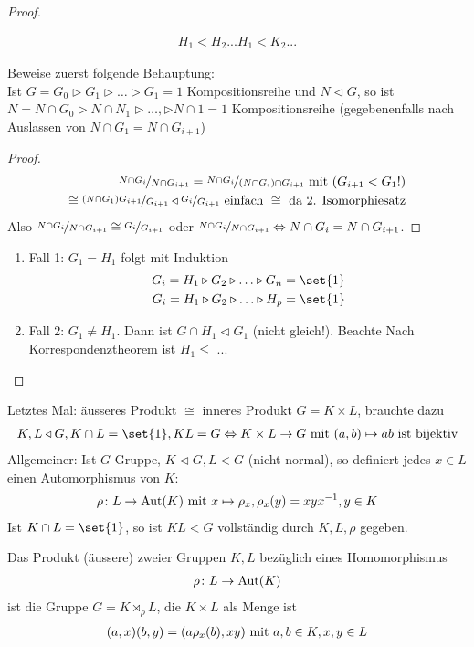\begin{proof}
\begin{itemize}
\begin{align*}
			H_1 < H_2 ...
			H_1 < K_2 ...
		\end{align*}
	\end{itemize}
	Beweise zuerst folgende Behauptung:\\
		Ist $G = G_0 \rhd G_1 \rhd \dots \rhd G_1 = 1$ Kompositionsreihe und $N \lhd G$, so ist $N = N \cap G_0 \rhd N \cap N_1 \rhd \dots, \rhd N \cap 1 = 1$ Kompositionsreihe (gegebenenfalls nach Auslassen von $N \cap G_1 = N \cap G_{i+1}$)
	\begin{proof}
		\begin{align*}
			\lnkset{N \cap G_i}{N \cap G_{i+1}} = \lnkset{N \cap G_i}{(N \cap G_i)\cap G_{i+1}} \mit (G_{i+1} < G_1!)\\
			\cong \lnkset{(N \cap G_1)G_{i+1}}{G_{i+1}} \lhd \lnkset{G_i}{G_{i+1}} \text{ einfach }\cong\text{ da 2. Isomorphiesatz}
		\end{align*}
		Also $\lnkset{N \cap G_i}{N \cap G_{i+1}} \cong \lnkset{G_i}{G_{i+1}}$ oder $\lnkset{N \cap G_i}{N \cap G_{i+1}} \Leftrightarrow N \cap G_i = N \cap G_{i+1}$.
	\end{proof}
\begin{enumerate}
	\item Fall 1: $G_1 = H_1$ folgt mit Induktion 
	\begin{align*}
		G_i = H_1 \rhd G_2 \rhd \dots \rhd G_n = \set{1}\\
		G_i = H_1 \rhd G_2 \rhd \dots \rhd H_p = \set{1}
	\end{align*}
	\item Fall 2: $G_1 \neq H_1$. Dann ist $G \cap H_1 \lhd G_1$ (nicht gleich!). Beachte Nach Korrespondenztheorem ist $H_1 \le$ ... %
\end{enumerate}
\end{proof}
Letztes Mal: äusseres Produkt $\cong$ inneres Produkt $G = K \times L$, brauchte dazu
\begin{align*}
	K,L \lhd G, K\cap L = \set{1}, KL=G \Leftrightarrow K \times L \to G \mit (a,b) \mapsto ab \text{ ist bijektiv}
\end{align*}
Allgemeiner: Ist $G$ Gruppe, $K\lhd G, L < G$ (nicht normal), so definiert jedes $x \in L$ einen Automorphismus von $K$:
\begin{align*}
	\rho\colon L \to \Aut(K) \mit x \mapsto \rho_x, \rho_x(y) = xyx^{-1}, y \in K
\end{align*}
Ist $K \cap L = \set{1}$, so ist $KL < G$ vollständig durch $K,L,\rho$ gegeben.
\begin{definition}
	Das  Produkt (äussere) zweier Gruppen $K,L$ bezüglich eines Homomorphismus
	\begin{align*}
		\rho\colon L \to \Aut(K)
	\end{align*}
	ist die Gruppe $G = K \rtimes_{\rho} L$, die $K \times L$ als Menge ist
	\begin{align*}
		(a,x)(b,y) = (a\rho_x(b),xy) \mit a,b \in K,x,y \in L
	\end{align*}
\end{definition}
